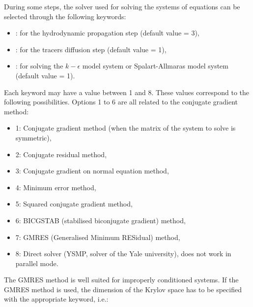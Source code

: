 During some steps, the solver used for solving the systems of equations
can be selected through the following keywords:

\begin{itemize}
\item {}: for the hydrodynamic propagation step
(default value = 3),

\item {}: for the tracers diffusion step
(default value = 1),

\item {}:
for solving the $k-\epsilon$ model system or Spalart-Allmaras model system
(default value = 1).
\end{itemize}

Each keyword may have a value between 1 and 8.
These values correspond to the following possibilities.
Options 1 to 6 are all related to the conjugate gradient method:

\begin{itemize}
\item 1: Conjugate gradient method (when the matrix of the system to solve
is symmetric),

\item 2: Conjugate residual method,

\item 3: Conjugate gradient on normal equation method,

\item 4: Minimum error method,

\item 5: Squared conjugate gradient method,

\item 6: BICGSTAB (stabilised biconjugate gradient) method,

\item 7: GMRES (Generalised Minimum RESidual) method,

\item 8: Direct solver (YSMP, solver of the Yale university),
does not work in parallel mode.

\end{itemize}

The GMRES method is well suited for improperly conditioned systems.
If the GMRES method is used, the dimension of the Krylov space has to be
specified with the appropriate keyword, i.e.:

